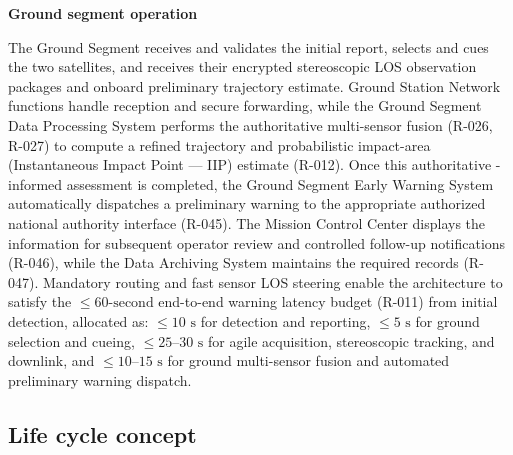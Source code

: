 \textbf{Ground segment operation}

The Ground Segment receives and validates the initial  report, selects and cues the two  satellites, and receives their encrypted stereoscopic LOS observation packages and onboard preliminary trajectory estimate. Ground Station Network functions handle reception and secure forwarding, while the Ground Segment Data Processing System performs the authoritative multi-sensor fusion (R-026, R-027) to compute a refined trajectory and probabilistic impact-area (Instantaneous Impact Point --- IIP) estimate (R-012). Once this authoritative -informed assessment is completed, the Ground Segment Early Warning System automatically dispatches a preliminary warning to the appropriate authorized national authority interface (R-045). The Mission Control Center displays the information for subsequent operator review and controlled follow-up notifications (R-046), while the Data Archiving System maintains the required records (R-047). Mandatory  routing and fast sensor LOS steering enable the architecture to satisfy the $\le 60\text{-second}$ end-to-end warning latency budget (R-011) from initial  detection, allocated as: $\le 10\text{ s}$ for  detection and reporting, $\le 5\text{ s}$ for ground selection and  cueing, $\le 25\text{--}30\text{ s}$ for  agile acquisition, stereoscopic tracking, and downlink, and $\le 10\text{--}15\text{ s}$ for ground multi-sensor fusion and automated preliminary warning dispatch.

\subsection{Life cycle concept}

